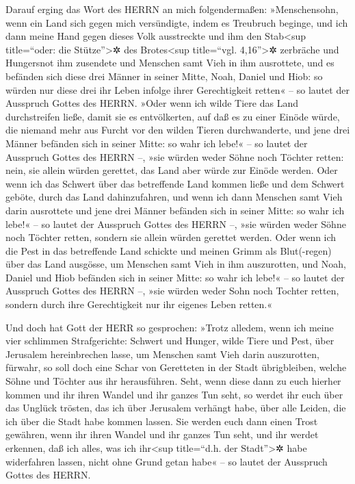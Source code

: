 Darauf erging das Wort des HERRN an mich folgendermaßen:
»Menschensohn, wenn ein Land sich gegen mich versündigte,
indem es Treubruch beginge, und ich dann meine Hand gegen dieses Volk
ausstreckte und ihm den Stab\textless sup title=``oder: die
Stütze''\textgreater✲ des Brotes\textless sup title=``vgl.
4,16''\textgreater✲ zerbräche und Hungersnot ihm zusendete und Menschen
samt Vieh in ihm ausrottete, und es befänden sich diese
drei Männer in seiner Mitte, Noah, Daniel und Hiob: so würden nur diese
drei ihr Leben infolge ihrer Gerechtigkeit retten« -- so lautet der
Ausspruch Gottes des HERRN. »Oder wenn ich wilde Tiere
das Land durchstreifen ließe, damit sie es entvölkerten, auf daß es zu
einer Einöde würde, die niemand mehr aus Furcht vor den wilden Tieren
durchwanderte, und jene drei Männer befänden sich in
seiner Mitte: so wahr ich lebe!« -- so lautet der Ausspruch Gottes des
HERRN --, »sie würden weder Söhne noch Töchter retten: nein, sie allein
würden gerettet, das Land aber würde zur Einöde werden.
Oder wenn ich das Schwert über das betreffende Land
kommen ließe und dem Schwert geböte, durch das Land dahinzufahren, und
wenn ich dann Menschen samt Vieh darin ausrottete und
jene drei Männer befänden sich in seiner Mitte: so wahr ich lebe!« -- so
lautet der Ausspruch Gottes des HERRN --, »sie würden weder Söhne noch
Töchter retten, sondern sie allein würden gerettet werden.
Oder wenn ich die Pest in das betreffende Land schickte
und meinen Grimm als Blut(-regen) über das Land ausgösse, um Menschen
samt Vieh in ihm auszurotten, und Noah, Daniel und Hiob
befänden sich in seiner Mitte: so wahr ich lebe!« -- so lautet der
Ausspruch Gottes des HERRN --, »sie würden weder Sohn noch Tochter
retten, sondern durch ihre Gerechtigkeit nur ihr eigenes Leben retten.«

Und doch hat Gott der HERR so gesprochen: »Trotz alledem,
wenn ich meine vier schlimmen Strafgerichte: Schwert und Hunger, wilde
Tiere und Pest, über Jerusalem hereinbrechen lasse, um Menschen samt
Vieh darin auszurotten, fürwahr, so soll doch eine Schar
von Geretteten in der Stadt übrigbleiben, welche Söhne und Töchter aus
ihr herausführen. Seht, wenn diese dann zu euch hierher kommen und ihr
ihren Wandel und ihr ganzes Tun seht, so werdet ihr euch über das
Unglück trösten, das ich über Jerusalem verhängt habe, über alle Leiden,
die ich über die Stadt habe kommen lassen. Sie werden
euch dann einen Trost gewähren, wenn ihr ihren Wandel und ihr ganzes Tun
seht, und ihr werdet erkennen, daß ich alles, was ich ihr\textless sup
title=``d.h. der Stadt''\textgreater✲ habe widerfahren lassen, nicht
ohne Grund getan habe« -- so lautet der Ausspruch Gottes des HERRN.

